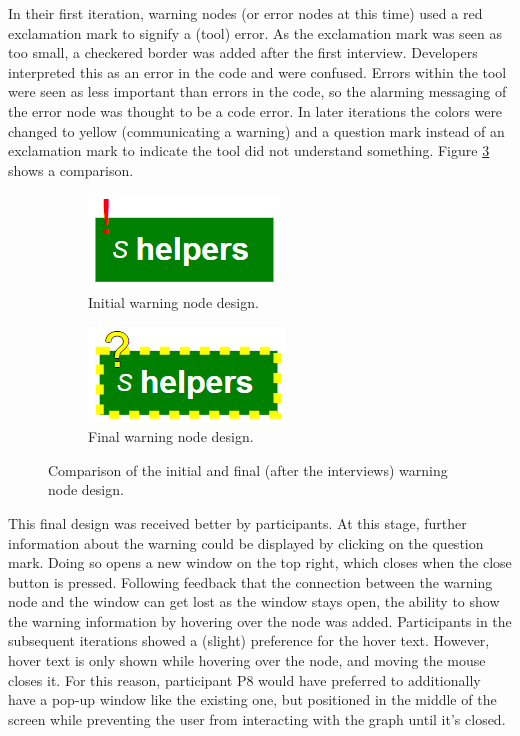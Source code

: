 \documentclass[a4paper,11pt,twoside]{article}
\theoremstyle{definition} %
\begin{document}
In their first iteration, warning nodes (or error nodes at this time) used a red exclamation mark to signify a (tool) error. As the exclamation mark was seen as too small, a checkered border was added after the first interview. Developers interpreted this as an error in the code and were confused. Errors within the tool were seen as less important than errors in the code, so the alarming messaging of the error node was thought to be a code error. In later iterations the colors were changed to yellow (communicating a warning) and a question mark instead of an exclamation mark to indicate the tool did not understand something. Figure \ref{fig:warningComparison} shows a comparison.

\begin{figure}[h!]
\centering
\begin{subfigure}{.5\textwidth}
  \centering
  \includegraphics[width=0.3\linewidth]{Subfigures/warnings_initial.PNG}
  \caption{Initial warning node design.}
  \label{fig:initial-warnings}
\end{subfigure}%
\begin{subfigure}{.5\textwidth}
  \centering
  \includegraphics[width=0.3\linewidth]{Subfigures/warnings_final.PNG}
  \caption{Final warning node design.}
  \label{fig:final-warnings}
\end{subfigure}
\caption{Comparison of the initial and final (after the interviews) warning node design.}
\label{fig:warningComparison}
\end{figure}

This final design was received better by participants. At this stage, further information about the warning could be displayed by clicking on the question mark. Doing so opens a new window on the top right, which closes when the close button is pressed. Following feedback that the connection between the warning node and the window can get lost as the window stays open, the ability to show the warning information by hovering over the node was added. Participants in the subsequent iterations showed a (slight) preference for the hover text. However, hover text is only shown while hovering over the node, and moving the mouse closes it. For this reason, participant P8 would have preferred to additionally have a pop-up window like the existing one, but positioned in the middle of the screen while preventing the user from interacting with the graph until it’s closed.
\end{document}
